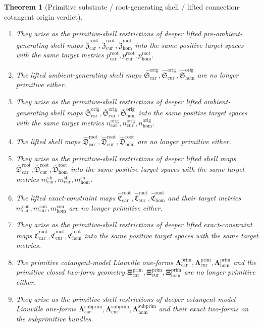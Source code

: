 \documentclass[11pt]{article}
\newcommand{\TensorShellMetric}{m_{\mathrm{car}}^{\mathrm{sh}}}
\newcommand{\CurShellMetric}{m_{\mathrm{cur}}^{\mathrm{sh}}}
\newcommand{\HomShellMetric}{m_{\mathrm{hom}}^{\mathrm{sh}}}
\newcommand{\TensorConstraintMetric}{m_{\mathrm{car}}^{\mathrm{con}}}
\newcommand{\CurConstraintMetric}{m_{\mathrm{cur}}^{\mathrm{con}}}
\newcommand{\HomConstraintMetric}{m_{\mathrm{hom}}^{\mathrm{con}}}
\newcommand{\TensorOriginTargetMetric}{n_{\mathrm{car}}^{\mathrm{orig}}}
\newcommand{\CurOriginTargetMetric}{n_{\mathrm{cur}}^{\mathrm{orig}}}
\newcommand{\HomOriginTargetMetric}{n_{\mathrm{hom}}^{\mathrm{orig}}}
\newcommand{\TensorRootTargetMetric}{p_{\mathrm{car}}^{\mathrm{root}}}
\newcommand{\CurRootTargetMetric}{p_{\mathrm{cur}}^{\mathrm{root}}}
\newcommand{\HomRootTargetMetric}{p_{\mathrm{hom}}^{\mathrm{root}}}
\newcommand{\TensorPrimitiveLiftedAmbientSection}{\widehat{\mathfrak S}_{\mathrm{car}}^{\mathrm{orig}}}
\newcommand{\CurPrimitiveLiftedAmbientSection}{\widehat{\mathfrak S}_{\mathrm{cur}}^{\mathrm{orig}}}
\newcommand{\HomPrimitiveLiftedAmbientSection}{\widehat{\mathfrak S}_{\mathrm{hom}}^{\mathrm{orig}}}
\newcommand{\TensorPrimitiveLiftedShellSection}{\widehat{\mathfrak D}_{\mathrm{car}}^{\mathrm{root}}}
\newcommand{\CurPrimitiveLiftedShellSection}{\widehat{\mathfrak D}_{\mathrm{cur}}^{\mathrm{root}}}
\newcommand{\HomPrimitiveLiftedShellSection}{\widehat{\mathfrak D}_{\mathrm{hom}}^{\mathrm{root}}}
\newcommand{\TensorPrimitiveConstraintMap}{\widehat{\mathfrak C}_{\mathrm{car}}^{\mathrm{root}}}
\newcommand{\CurPrimitiveConstraintMap}{\widehat{\mathfrak C}_{\mathrm{cur}}^{\mathrm{root}}}
\newcommand{\HomPrimitiveConstraintMap}{\widehat{\mathfrak C}_{\mathrm{hom}}^{\mathrm{root}}}
\newcommand{\TensorPrimitiveLiouville}{\boldsymbol{\Lambda}_{\mathrm{car}}^{\mathrm{prim}}}
\newcommand{\CurPrimitiveLiouville}{\boldsymbol{\Lambda}_{\mathrm{cur}}^{\mathrm{prim}}}
\newcommand{\HomPrimitiveLiouville}{\boldsymbol{\Lambda}_{\mathrm{hom}}^{\mathrm{prim}}}
\newcommand{\TensorPrimitiveTwo}{\boldsymbol{\Xi}_{\mathrm{car}}^{\mathrm{prim}}}
\newcommand{\CurPrimitiveTwo}{\boldsymbol{\Xi}_{\mathrm{cur}}^{\mathrm{prim}}}
\newcommand{\HomPrimitiveTwo}{\boldsymbol{\Xi}_{\mathrm{hom}}^{\mathrm{prim}}}
\newcommand{\TensorSubprimitiveLiftedPreAmbientSection}{\overline{\mathfrak Z}_{\mathrm{car}}^{\mathrm{root}}}
\newcommand{\CurSubprimitiveLiftedPreAmbientSection}{\overline{\mathfrak Z}_{\mathrm{cur}}^{\mathrm{root}}}
\newcommand{\HomSubprimitiveLiftedPreAmbientSection}{\overline{\mathfrak Z}_{\mathrm{hom}}^{\mathrm{root}}}
\newcommand{\TensorSubprimitiveLiftedAmbientSection}{\overline{\mathfrak S}_{\mathrm{car}}^{\mathrm{orig}}}
\newcommand{\CurSubprimitiveLiftedAmbientSection}{\overline{\mathfrak S}_{\mathrm{cur}}^{\mathrm{orig}}}
\newcommand{\HomSubprimitiveLiftedAmbientSection}{\overline{\mathfrak S}_{\mathrm{hom}}^{\mathrm{orig}}}
\newcommand{\TensorSubprimitiveLiftedShellSection}{\overline{\mathfrak D}_{\mathrm{car}}^{\mathrm{root}}}
\newcommand{\CurSubprimitiveLiftedShellSection}{\overline{\mathfrak D}_{\mathrm{cur}}^{\mathrm{root}}}
\newcommand{\HomSubprimitiveLiftedShellSection}{\overline{\mathfrak D}_{\mathrm{hom}}^{\mathrm{root}}}
\newcommand{\TensorSubprimitiveConstraintMap}{\overline{\mathfrak C}_{\mathrm{car}}^{\mathrm{root}}}
\newcommand{\CurSubprimitiveConstraintMap}{\overline{\mathfrak C}_{\mathrm{cur}}^{\mathrm{root}}}
\newcommand{\HomSubprimitiveConstraintMap}{\overline{\mathfrak C}_{\mathrm{hom}}^{\mathrm{root}}}
\newcommand{\TensorSubprimitiveLiouville}{\boldsymbol{\Lambda}_{\mathrm{car}}^{\mathrm{subprim}}}
\newcommand{\CurSubprimitiveLiouville}{\boldsymbol{\Lambda}_{\mathrm{cur}}^{\mathrm{subprim}}}
\newcommand{\HomSubprimitiveLiouville}{\boldsymbol{\Lambda}_{\mathrm{hom}}^{\mathrm{subprim}}}
\newtheorem{theorem}{Theorem}
\begin{document}
\begin{theorem}[Primitive substrate / root-generating shell / lifted connection-cotangent origin verdict]
\begin{enumerate}
    \item They arise as the primitive-shell restrictions of deeper lifted pre-ambient-generating shell maps \(\TensorSubprimitiveLiftedPreAmbientSection,\CurSubprimitiveLiftedPreAmbientSection,\HomSubprimitiveLiftedPreAmbientSection\) into the same positive target spaces with the same target metrics \(\TensorRootTargetMetric,\CurRootTargetMetric,\HomRootTargetMetric\).
    \item The lifted ambient-generating shell maps \(\TensorPrimitiveLiftedAmbientSection,\CurPrimitiveLiftedAmbientSection,\HomPrimitiveLiftedAmbientSection\) are no longer primitive either.
    \item They arise as the primitive-shell restrictions of deeper lifted ambient-generating shell maps \(\TensorSubprimitiveLiftedAmbientSection,\CurSubprimitiveLiftedAmbientSection,\HomSubprimitiveLiftedAmbientSection\) into the same positive target spaces with the same target metrics \(\TensorOriginTargetMetric,\CurOriginTargetMetric,\HomOriginTargetMetric\).
    \item The lifted shell maps \(\TensorPrimitiveLiftedShellSection,\CurPrimitiveLiftedShellSection,\HomPrimitiveLiftedShellSection\) are no longer primitive either.
    \item They arise as the primitive-shell restrictions of deeper lifted shell maps \(\TensorSubprimitiveLiftedShellSection,\CurSubprimitiveLiftedShellSection,\HomSubprimitiveLiftedShellSection\) into the same positive target spaces with the same target metrics \(\TensorShellMetric,\CurShellMetric,\HomShellMetric\).
    \item The lifted exact-constraint maps \(\TensorPrimitiveConstraintMap,\CurPrimitiveConstraintMap,\HomPrimitiveConstraintMap\) and their target metrics \(\TensorConstraintMetric,\CurConstraintMetric,\HomConstraintMetric\) are no longer primitive either.
    \item They arise as the primitive-shell restrictions of deeper lifted exact-constraint maps \(\TensorSubprimitiveConstraintMap,\CurSubprimitiveConstraintMap,\HomSubprimitiveConstraintMap\) into the same positive target spaces with the same target metrics.
    \item The primitive cotangent-model Liouville one-forms \(\TensorPrimitiveLiouville,\CurPrimitiveLiouville,\HomPrimitiveLiouville\) and the primitive closed two-form geometry \(\TensorPrimitiveTwo,\CurPrimitiveTwo,\HomPrimitiveTwo\) are no longer primitive either.
    \item They arise as the primitive-shell restrictions of deeper cotangent-model Liouville one-forms \(\TensorSubprimitiveLiouville,\CurSubprimitiveLiouville,\HomSubprimitiveLiouville\) and their exact two-forms on the subprimitive bundles.

\end{enumerate}
\end{theorem}
\end{document}
